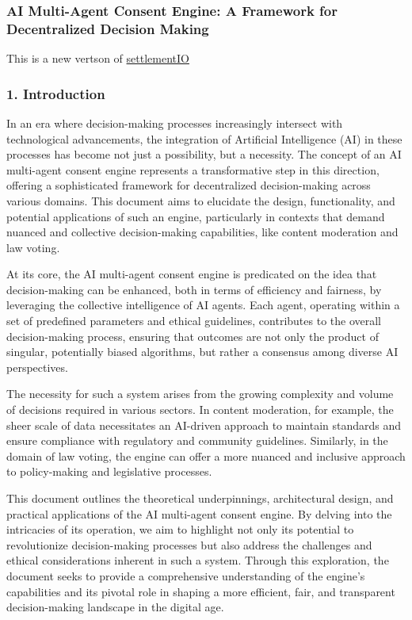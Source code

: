 \hypertarget{ai-multi-agent-consent-engine-a-framework-for-decentralized-decision-making}{%
\subsubsection{AI Multi-Agent Consent Engine: A Framework for
Decentralized Decision
Making}\label{ai-multi-agent-consent-engine-a-framework-for-decentralized-decision-making}}

This is a new vertson of
\href{https://github.com/jucasoliveira/settlementIO}{settlementIO}

\hypertarget{introduction}{%
\subsubsection{1. Introduction}\label{introduction}}

In an era where decision-making processes increasingly intersect with
technological advancements, the integration of Artificial Intelligence
(AI) in these processes has become not just a possibility, but a
necessity. The concept of an AI multi-agent consent engine represents a
transformative step in this direction, offering a sophisticated
framework for decentralized decision-making across various domains. This
document aims to elucidate the design, functionality, and potential
applications of such an engine, particularly in contexts that demand
nuanced and collective decision-making capabilities, like content
moderation and law voting.

At its core, the AI multi-agent consent engine is predicated on the idea
that decision-making can be enhanced, both in terms of efficiency and
fairness, by leveraging the collective intelligence of AI agents. Each
agent, operating within a set of predefined parameters and ethical
guidelines, contributes to the overall decision-making process, ensuring
that outcomes are not only the product of singular, potentially biased
algorithms, but rather a consensus among diverse AI perspectives.

The necessity for such a system arises from the growing complexity and
volume of decisions required in various sectors. In content moderation,
for example, the sheer scale of data necessitates an AI-driven approach
to maintain standards and ensure compliance with regulatory and
community guidelines. Similarly, in the domain of law voting, the engine
can offer a more nuanced and inclusive approach to policy-making and
legislative processes.

This document outlines the theoretical underpinnings, architectural
design, and practical applications of the AI multi-agent consent engine.
By delving into the intricacies of its operation, we aim to highlight
not only its potential to revolutionize decision-making processes but
also address the challenges and ethical considerations inherent in such
a system. Through this exploration, the document seeks to provide a
comprehensive understanding of the engine's capabilities and its pivotal
role in shaping a more efficient, fair, and transparent decision-making
landscape in the digital age.

